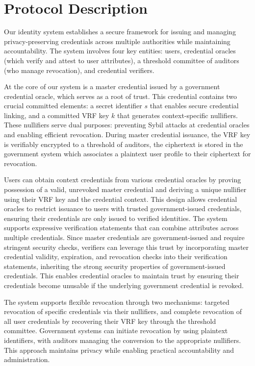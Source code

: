 \newpage
\section{Protocol Description}
Our identity system establishes a secure framework for issuing and managing privacy-preserving credentials across multiple authorities while maintaining accountability. The system involves four key entities: users, credential oracles (which verify and attest to user attributes), a threshold committee of auditors (who manage revocation), and credential verifiers.

\noindent At the core of our system is a master credential issued by a government credential oracle, which serves as a root of trust. This credential contains two crucial committed elements: a secret identifier $s$ that enables secure credential linking, and a committed VRF key $k$ that generates context-specific nullifiers. These nullifiers serve dual purposes: preventing Sybil attacks at credential oracles and enabling efficient revocation. During master credential issuance, the VRF key is verifiably encrypted to a threshold of auditors, the ciphertext is stored in the government system which associates a plaintext user profile to their ciphertext for revocation.


\noindent Users can obtain context credentials from various credential oracles by proving possession of a valid, unrevoked master credential and deriving a unique nullifier using their VRF key and the credential context. This design allows credential oracles to restrict issuance to users with trusted government-issued credentials, ensuring their credentials are only issued to verified identities. The system supports expressive verification statements that can combine attributes across multiple credentials. Since master credentials are government-issued and require stringent security checks, verifiers can leverage this trust by incorporating master credential validity, expiration, and revocation checks into their verification statements, inheriting the strong security properties of government-issued credentials. This enables credential oracles to maintain trust by ensuring their credentials become unusable if the underlying government credential is revoked.


\noindent The system supports flexible revocation through two mechanisms: targeted revocation of specific credentials via their nullifiers, and complete revocation of all user credentials by recovering their VRF key through the threshold committee. Government systems can initiate revocation by using plaintext identifiers, with auditors managing the conversion to the appropriate nullifiers. This approach maintains privacy while enabling practical accountability and administration.

